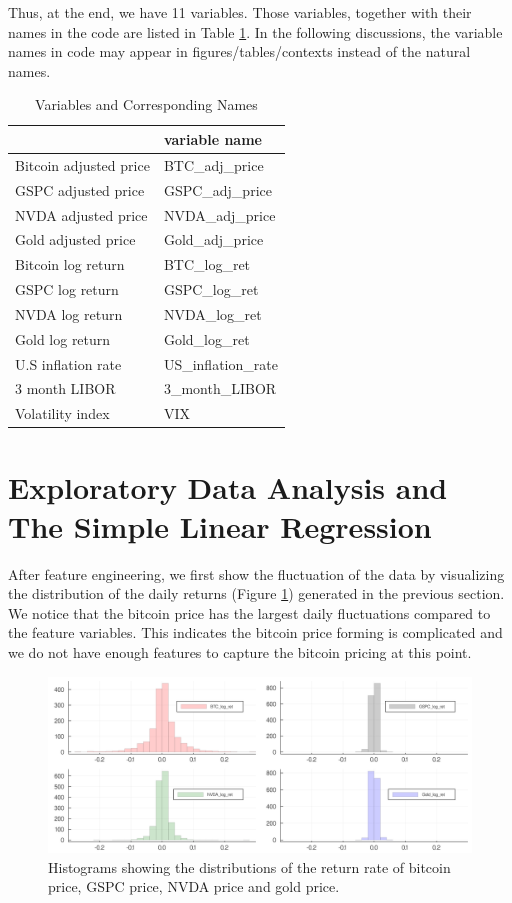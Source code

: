 \documentclass[9pt,twocolumn,twoside]{ilcss}
\begin{document}
Thus, at the end, we have 11 variables. Those variables, together with their names in the code are listed in Table \ref{var_names}. In the following discussions, the variable names in code may appear in figures/tables/contexts instead of the natural names.

\begin{table}[h]
\centering
\caption{Variables and Corresponding Names}
\label{var_names}
\begin{tabular}{@{\extracolsep{10pt}}ll} 
\hline
\hline
                       & variable name        \\ 
\hline
Bitcoin adjusted price & BTC\_adj\_price      \\
GSPC adjusted price    & GSPC\_adj\_price     \\
NVDA adjusted price    & NVDA\_adj\_price     \\
Gold adjusted price    & Gold\_adj\_price     \\
Bitcoin log return     & BTC\_log\_ret        \\
GSPC log return        & GSPC\_log\_ret       \\
NVDA log return        & NVDA\_log\_ret       \\
Gold log return        & Gold\_log\_ret       \\
U.S inflation rate     & US\_inflation\_rate  \\
3 month LIBOR          & 3\_month\_LIBOR      \\
Volatility index       & VIX                  \\
\hline
\end{tabular}
\end{table}

\section{Exploratory Data Analysis and The Simple Linear Regression}
After feature engineering, we first show the fluctuation of the data by visualizing the distribution of the daily returns (Figure \ref{hist_distribution}) generated in the previous section. We notice that the bitcoin price has the largest daily fluctuations compared to the feature variables. This indicates the bitcoin price forming is complicated and we do not have enough features to capture the bitcoin pricing at this point.

\begin{figure}[tbhp]
\centering
\includegraphics[width=.85\linewidth]{return_hists.png}
\caption{Histograms showing the distributions of the return rate of bitcoin price, GSPC price, NVDA price and gold price.}
\label{hist_distribution}
\end{figure}
\end{document}
